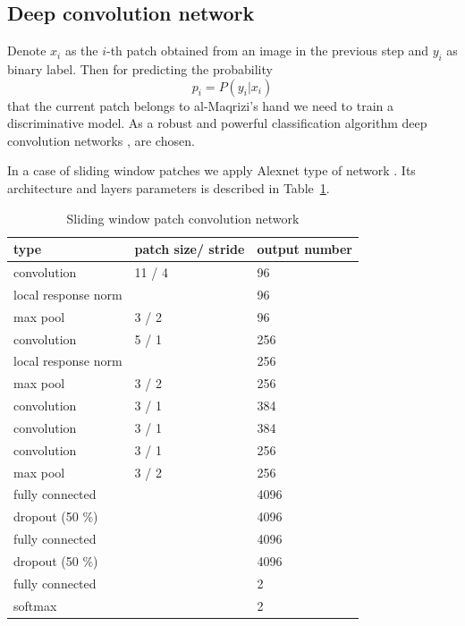 \documentclass[conference,a4paper,twocolumn]{IEEEtran}
\begin{document}

\subsection{Deep convolution network}

Denote $x_i$ as the $i$-th patch obtained from an image in the previous step and $y_i$ as binary label. Then for predicting the probability
\begin{equation*}
	p_i = P(y_i | x_i)
\end{equation*}
that the current patch belongs to al-Maqrizi's hand we need to train a discriminative model. As a robust and powerful classification algorithm deep convolution networks \cite{DL}, \cite{CNN} are chosen. 

In a case of sliding window patches we apply Alexnet type of network \cite{Alexnet}. Its architecture and layers parameters is described in Table~\ref{alexnet_tab}. 
\begin{table}[!b]
\centering
\caption{Sliding window patch convolution network}
\label{alexnet_tab}
\begin{tabular}{|l|p{1.3cm}|p{1.3cm}|}
\hline
\textbf{type} & \textbf{patch size/ stride} & \textbf{output number}  \\
\hline
convolution & 11 / 4 & 96 \\
\hline
local response norm & & 96 \\
\hline
max pool & 3 / 2 & 96 \\
\hline
convolution & 5 / 1 & 256 \\
\hline
local response norm & & 256 \\
\hline
max pool & 3 / 2 & 256 \\
\hline
convolution & 3 / 1 & 384 \\
\hline
convolution & 3 / 1 & 384 \\
\hline
convolution & 3 / 1 & 256 \\
\hline
max pool & 3 / 2 & 256 \\
\hline
fully connected & & 4096 \\
\hline
dropout (50 \%) & & 4096 \\
\hline
fully connected & & 4096 \\
\hline
dropout (50 \%) & & 4096 \\
\hline
fully connected & & 2 \\
\hline
softmax & & 2 \\
\hline
\end{tabular}
\end{table}
\end{document}
